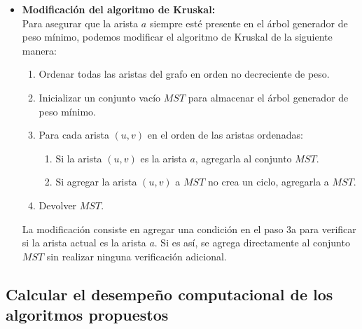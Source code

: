 \begin{itemize}
  \item \textbf{Modificación del algoritmo de Kruskal:}\\
  Para asegurar que la arista $a$ siempre esté presente en el árbol generador de peso mínimo, podemos modificar el algoritmo de Kruskal de la siguiente manera:\\
  \begin{enumerate}
    \item Ordenar todas las aristas del grafo en orden no decreciente de peso.
    \item Inicializar un conjunto vacío $MST$ para almacenar el árbol generador de peso mínimo.
    \item Para cada arista $(u, v)$ en el orden de las aristas ordenadas:
    \begin{enumerate}
      \item Si la arista $(u, v)$ es la arista $a$, agregarla al conjunto $MST$.
\item Si agregar la arista $(u, v)$ a $MST$ no crea un ciclo, agregarla a $MST$.
    \end{enumerate}
    \item Devolver $MST$.
  \end{enumerate}
  La modificación consiste en agregar una condición en el paso 3a para verificar si la arista actual es la arista $a$. Si es así, se agrega directamente al conjunto $MST$ sin realizar ninguna verificación adicional.
\end{itemize}

\subsection{Calcular el desempeño computacional de los algoritmos propuestos}

